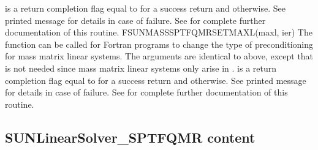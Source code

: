 {
   is a  return completion flag equal to  for a success
  return and  otherwise. See printed message for details in case
  of failure.
}
{
  See  for complete further
  documentation of this routine.
}
%
%
{
  FSUNMASSSPTFQMRSETMAXL(maxl, ier)
}
{
  The function  can be called for Fortran
  programs to change the type of preconditioning for mass matrix
  linear systems.
}
{
  The arguments are identical to  above, except that
   is not needed since mass matrix linear systems only arise
  in {\arkode}.
}
{
   is a  return completion flag equal to  for a success
  return and  otherwise. See printed message for details in case
  of failure.
}
{
  See  for complete further
  documentation of this routine.
}
%
%

\subsection{SUNLinearSolver\_SPTFQMR content}
\label{ss:sunlinsol_sptfqmr_content}

